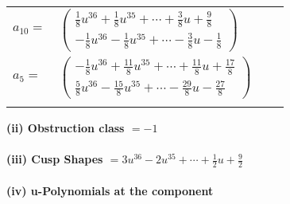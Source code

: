 \documentclass[1p]{elsarticle_modified}
\theoremstyle{definition}
\begin{document}
\begin{tabular}{m{7pt} m{180pt} m{7pt} m{180pt} }
\flushright $a_{10}=$&$\begin{pmatrix}\frac{1}{8} u^{36}+\frac{1}{8} u^{35}+\cdots+\frac{3}{8} u+\frac{9}{8}\\-\frac{1}{8} u^{36}-\frac{1}{8} u^{35}+\cdots-\frac{3}{8} u-\frac{1}{8}\end{pmatrix}$ \\
\flushright $a_{5}=$&$\begin{pmatrix}-\frac{1}{8} u^{36}+\frac{11}{8} u^{35}+\cdots+\frac{11}{8} u+\frac{17}{8}\\\frac{5}{8} u^{36}-\frac{15}{8} u^{35}+\cdots-\frac{29}{8} u-\frac{27}{8}\end{pmatrix}$\\&\end{tabular}
\flushleft \textbf{(ii) Obstruction class $= -1$}\\~\\
\flushleft \textbf{(iii) Cusp Shapes $= 3 u^{36}-2 u^{35}+\cdots+\frac{1}{2} u+\frac{9}{2}$}\\~\\
\newpage\renewcommand{\arraystretch}{1}
\flushleft \textbf{(iv) u-Polynomials at the component}\newline \\
\end{document}
